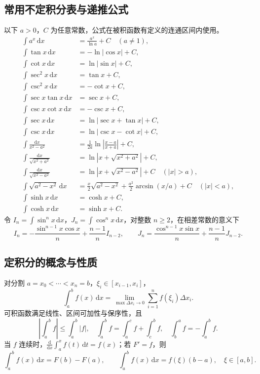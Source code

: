 \documentclass[../main.tex]{subfiles}
\begin{document}
\subsection{常用不定积分表与递推公式}
以下 $a>0$，$C$ 为任意常数，公式在被积函数有定义的连通区间内使用。
\begingroup
\allowdisplaybreaks[1]
\begin{align*}
\int a^x\,\mathrm dx&=\frac{a^x}{\ln a}+C\quad(a\ne1),\\
\int\tan x\,\mathrm dx&=-\ln|\cos x|+C,\\
\int\cot x\,\mathrm dx&=\ln|\sin x|+C,\\
\int\sec^2x\,\mathrm dx&=\tan x+C,\\
\int\csc^2x\,\mathrm dx&=-\cot x+C,\\
\int\sec x\tan x\,\mathrm dx&=\sec x+C,\\
\int\csc x\cot x\,\mathrm dx&=-\csc x+C,\\
\int\sec x\,\mathrm dx&=\ln|\sec x+\tan x|+C,\\
\int\csc x\,\mathrm dx&=\ln|\csc x-\cot x|+C,\\
\int\frac{\mathrm dx}{x^2-a^2}&=\frac1{2a}\ln\left|\frac{x-a}{x+a}\right|+C,\\
\int\frac{\mathrm dx}{\sqrt{x^2+a^2}}&=\ln\left|x+\sqrt{x^2+a^2}\right|+C,\\
\int\frac{\mathrm dx}{\sqrt{x^2-a^2}}&=\ln\left|x+\sqrt{x^2-a^2}\right|+C\quad(|x|>a),\\
\int\sqrt{a^2-x^2}\,\mathrm dx&=\frac x2\sqrt{a^2-x^2}+\frac{a^2}2\arcsin(x/a)+C\quad(|x|<a),\\
\int\sinh x\,\mathrm dx&=\cosh x+C,\\
\int\cosh x\,\mathrm dx&=\sinh x+C.
\end{align*}
\endgroup
令 $I_n=\int\sin^n x\,\mathrm dx$，$J_n=\int\cos^n x\,\mathrm dx$，对整数 $n\ge2$，在相差常数的意义下
\[
I_n=-\frac{\sin^{n-1}x\cos x}{n}+\frac{n-1}{n}I_{n-2},\qquad
J_n=\frac{\cos^{n-1}x\sin x}{n}+\frac{n-1}{n}J_{n-2}.
\]
\subsection{定积分的概念与性质}
对分割 $a=x_0<\cdots<x_n=b$，$\xi_i\in[x_{i-1},x_i]$，
\[
\int_a^b f(x)\,\mathrm dx=\lim_{\max\Delta x_i\to0}\sum_{i=1}^n f(\xi_i)\Delta x_i.
\]
可积函数满足线性、区间可加性与保序性，且
\[
\left|\int_a^b f\right|\le\int_a^b|f|,\quad
\int_a^b f=\int_a^c f+\int_c^b f,\quad
\int_b^a f=-\int_a^b f.
\]
当 $f$ 连续时，$\frac{\mathrm d}{\mathrm dx}\int_a^x f(t)\,\mathrm dt=f(x)$；若 $F'=f$，则
\[
\int_a^b f(x)\,\mathrm dx=F(b)-F(a),\qquad
\int_a^b f(x)\,\mathrm dx=f(\xi)(b-a),\quad \xi\in[a,b].
\]
\end{document}
